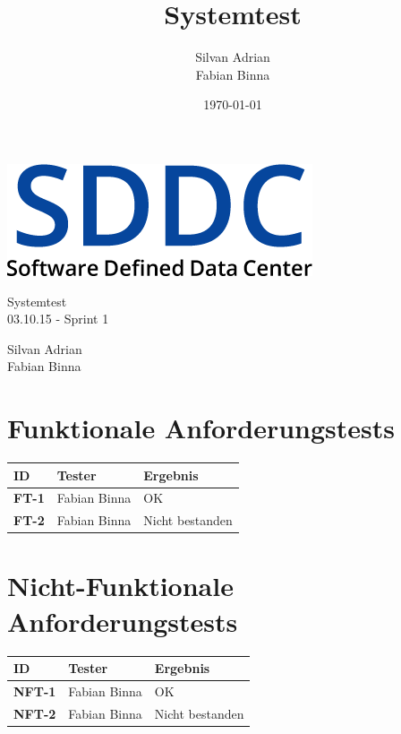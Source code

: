 \documentclass[11pt]{scrartcl}
\title{Systemtest}
\author{Silvan Adrian \\ Fabian Binna}
\date{\today{}}
\begin{document}
\def\arraystretch{1.5}
\begin{titlepage}
\begin{center}
\vspace{10em}
\includegraphics[scale=2]{SDDC}
\vspace{10em}
\end{center}
\begin{center}
\huge {Systemtest}\\
\huge {03.10.15 - Sprint 1}\\
\end{center}
\begin{center}
\vspace{10em}
\LARGE {Silvan Adrian} \\
\LARGE {Fabian Binna}
\end{center}

\end{titlepage}


\newpage
\tableofcontents
\newpage

\section{Funktionale Anforderungstests}

\begin{tabularx}{\linewidth}{l l l}
\textbf{ID} & \textbf{Tester} & \textbf{Ergebnis}\\
\hline

\textbf{FT-1} & Fabian Binna & OK \\
\textbf{FT-2} & Fabian Binna & Nicht bestanden \\

\end{tabularx}

\section{Nicht-Funktionale Anforderungstests}

\begin{tabularx}{\linewidth}{l l l}
\textbf{ID} & \textbf{Tester} & \textbf{Ergebnis}\\
\hline

\textbf{NFT-1} & Fabian Binna & OK \\
\textbf{NFT-2} & Fabian Binna & Nicht bestanden \\

\end{tabularx}
\end{document}
